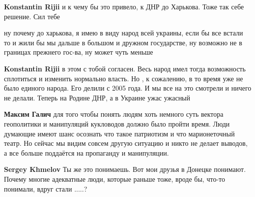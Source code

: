 \textbf{Konstantin Rijii} и к чему бы это привело, к ДНР до Харькова. Тоже так себе решение.
Сил тебе

 
ну почему до харькова, я имею в виду народ всей украины, если бы все встали то
и жили бы мы дальше в большом и дружном государстве, ну возможно не в границах
прежнего гос-ва, ну может чуть меньше

 
\textbf{Konstantin Rijii} в этом с тобой согласен. Весь народ имел тогда возможность сплотиться и изменить нормально власть. Но , к сожалению, в то время уже не было единого народа. Его делили с 2005 года. И мы все на это смотрели и ничего не делали. Теперь на Родине ДНР, а в Украине ужас ужасный

 
\textbf{Максим Галич} для того чтобы понять людям хоть немного суть вектора геополитики и манипуляций кукловодов должно было пройти время. Люди думающие имеют шанс осознать что такое патриотизм и что марионеточный театр. Но сейчас мы видим совсем другую ситуацию и никто не делает выводов, а все больше поддаётся на пропаганду и манипуляции.

 
\textbf{Sergey Khmelov} Ты же это понимаешь. Вот мои друзья в Донецке понимают. Почему многие адекватные люди, которые раньше тоже, вроде бы, что-то понимали, вдруг стали .....?

 
